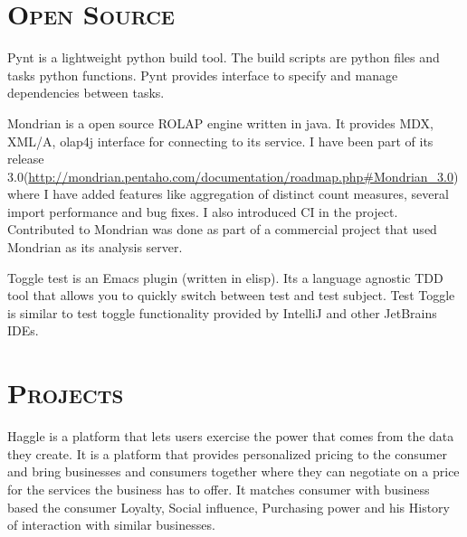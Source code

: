 \begin{resume}
\section{\textsc{Open Source}}

\begin{position}
Pynt is a lightweight python build tool. The build scripts are python files and tasks python functions. Pynt provides interface to specify and manage dependencies between tasks. 
\end{position}

\begin{position}
Mondrian is a open source ROLAP engine written in java. It provides MDX, XML/A, olap4j interface for connecting to its service. I have been part of its release 3.0(\url{http://mondrian.pentaho.com/documentation/roadmap.php#Mondrian_3.0}) where I have added features like aggregation of distinct count measures, several import performance and bug fixes. I also introduced CI in the project. Contributed to Mondrian  was done as part of a commercial project that used Mondrian as its analysis server.
\end{position}

\begin{position}
Toggle test is an Emacs plugin (written in elisp). Its a language agnostic TDD tool that allows you to quickly switch between test and test subject. Test Toggle is similar to test toggle functionality provided by IntelliJ and other JetBrains IDEs.
\end{position}

\section{\textsc{Projects}}

\begin{position}
Haggle is a platform that lets users exercise the power that comes from the data they create. It is a platform that provides personalized pricing to the consumer and bring businesses and consumers together where they can negotiate on a price for the services the business has to offer. It matches consumer with business based the consumer Loyalty, Social influence, Purchasing power and his History of interaction with similar businesses.


\end{position}
\end{resume}
